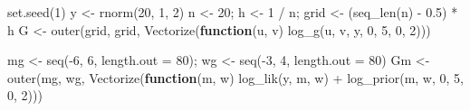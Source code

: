 \documentclass[
  letterpaper,
  DIV=11,
  numbers=noendperiod]{scrreprt}
\newenvironment{Shaded}{\begin{snugshade}}{\end{snugshade}}
\newcommand{\AttributeTok}[1]{\textcolor[rgb]{0.40,0.45,0.13}{#1}}
\newcommand{\ControlFlowTok}[1]{\textcolor[rgb]{0.00,0.23,0.31}{\textbf{#1}}}
\newcommand{\DecValTok}[1]{\textcolor[rgb]{0.68,0.00,0.00}{#1}}
\newcommand{\FloatTok}[1]{\textcolor[rgb]{0.68,0.00,0.00}{#1}}
\newcommand{\FunctionTok}[1]{\textcolor[rgb]{0.28,0.35,0.67}{#1}}
\newcommand{\NormalTok}[1]{\textcolor[rgb]{0.00,0.23,0.31}{#1}}
\newcommand{\OtherTok}[1]{\textcolor[rgb]{0.00,0.23,0.31}{#1}}
\newcommand{\SpecialCharTok}[1]{\textcolor[rgb]{0.37,0.37,0.37}{#1}}
\begin{document}
\begin{Shaded}
\begin{Highlighting}[]
\FunctionTok{set.seed}\NormalTok{(}\DecValTok{1}\NormalTok{)}
\NormalTok{y }\OtherTok{\textless{}{-}} \FunctionTok{rnorm}\NormalTok{(}\DecValTok{20}\NormalTok{, }\DecValTok{1}\NormalTok{, }\DecValTok{2}\NormalTok{)}
\NormalTok{n }\OtherTok{\textless{}{-}} \DecValTok{20}\NormalTok{; h }\OtherTok{\textless{}{-}} \DecValTok{1} \SpecialCharTok{/}\NormalTok{ n; grid }\OtherTok{\textless{}{-}}\NormalTok{ (}\FunctionTok{seq\_len}\NormalTok{(n) }\SpecialCharTok{{-}} \FloatTok{0.5}\NormalTok{) }\SpecialCharTok{*}\NormalTok{ h}
\NormalTok{G  }\OtherTok{\textless{}{-}} \FunctionTok{outer}\NormalTok{(grid, grid, }\FunctionTok{Vectorize}\NormalTok{(}\ControlFlowTok{function}\NormalTok{(u, v) }\FunctionTok{log\_g}\NormalTok{(u, v, y, }\DecValTok{0}\NormalTok{, }\DecValTok{5}\NormalTok{, }\DecValTok{0}\NormalTok{, }\DecValTok{2}\NormalTok{)))}

\NormalTok{mg }\OtherTok{\textless{}{-}} \FunctionTok{seq}\NormalTok{(}\SpecialCharTok{{-}}\DecValTok{6}\NormalTok{, }\DecValTok{6}\NormalTok{, }\AttributeTok{length.out =} \DecValTok{80}\NormalTok{); wg }\OtherTok{\textless{}{-}} \FunctionTok{seq}\NormalTok{(}\SpecialCharTok{{-}}\DecValTok{3}\NormalTok{, }\DecValTok{4}\NormalTok{, }\AttributeTok{length.out =} \DecValTok{80}\NormalTok{)}
\NormalTok{Gm }\OtherTok{\textless{}{-}} \FunctionTok{outer}\NormalTok{(mg, wg, }\FunctionTok{Vectorize}\NormalTok{(}\ControlFlowTok{function}\NormalTok{(m, w) }\FunctionTok{log\_lik}\NormalTok{(y, m, w) }\SpecialCharTok{+} \FunctionTok{log\_prior}\NormalTok{(m, w, }\DecValTok{0}\NormalTok{, }\DecValTok{5}\NormalTok{, }\DecValTok{0}\NormalTok{, }\DecValTok{2}\NormalTok{)))}


\end{Highlighting}
\end{Shaded}
\end{document}
